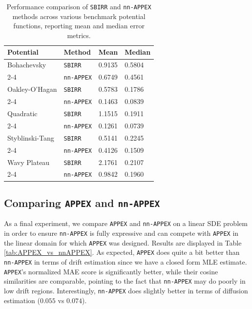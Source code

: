 \documentclass[twoside]{article}
\newcommand{\nappex}{\texttt{nn-APPEX}}
\newcommand{\appex}{\texttt{APPEX}}
\newcommand{\sbirr}{\texttt{SBIRR}}
\begin{document}
\begin{table}[h]
    \centering
    \caption{Performance comparison of \sbirr{} and \nappex{} methods across various benchmark potential functions, reporting mean and median error metrics.}
    \label{tab:performance_comparison_mean_median}
    \begin{tabular}{llll}
        \toprule
        \textbf{Potential} & \textbf{Method} & \textbf{Mean} & \textbf{Median} \\
        \midrule
        Bohachevsky & \sbirr{} & 0.9135 & 0.5804 \\
        \cmidrule{2-4}
         & \nappex{} & 0.6749 & 0.4561 \\
        \midrule
        Oakley-O'Hagan & \sbirr{} & 0.5783 & 0.1786 \\
        \cmidrule{2-4}
         & \nappex{} & 0.1463 & 0.0839 \\
        \midrule
        Quadratic & \sbirr{} & 1.1515 & 0.1911 \\
        \cmidrule{2-4}
         & \nappex{} & 0.1261 & 0.0739 \\
        \midrule
        Styblinski-Tang & \sbirr{} & 0.5141 & 0.2245 \\
        \cmidrule{2-4}
         & \nappex{} & 0.4126 & 0.1509 \\
        \midrule
        Wavy Plateau & \sbirr{} & 2.1761 & 0.2107 \\
        \cmidrule{2-4}
         & \nappex{} & 0.9842 & 0.1960 \\
        \bottomrule
    \end{tabular}
\end{table}


\subsection{Comparing \appex{} and \nappex{}}

As a final experiment, we compare \appex{} and \nappex{} on a linear SDE problem in order to ensure \nappex{} is fully expressive and can compete with \appex{} in the linear domain for which \appex{} was designed. Results are displayed in Table \ref{tab:APPEX_vs_nnAPPEX}. As expected, \appex{} does quite a bit better than \nappex{} in terms of drift estimation since we have a closed form MLE estimate. \appex{}'s normalized MAE score is significantly better, while their cosine similarities are comparable, pointing to the fact that \nappex{} may do poorly in low drift regions. Interestingly, \nappex{} does slightly better in terms of diffusion estimation ($0.055$ vs $0.074$).
\end{document}
